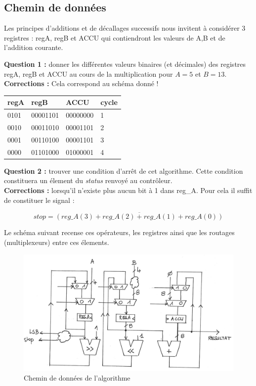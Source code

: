\documentclass[a4paper,11pt]{article}
\begin{document}
\subsection{Chemin de données}

Les principes d'additions et de décallages successifs nous invitent à considérer 3 registres : regA, regB et ACCU qui contiendront les valeurs de A,B et de l'addition courante.

\FloatBarrier

{\bf Question 1 : }  donner les différentes valeurs binaires (et décimales) des registres regA, regB et ACCU au cours de la multiplication pour $A=5$ et $B=13$.\\

{\bf Corrections :} Cela correspond au schéma donné !

\begin{table}
    \begin{tabular}{|l|l|l|l|}
        \hline
        regA & regB     & ACCU     & cycle \\ \hline
        0101 & 00001101 & 00000000 & 1     \\ \hline
        0010 & 00011010 & 00001101 & 2     \\ \hline
        0001 & 00110100 & 00001101 & 3     \\ \hline
        0000 & 01101000 & 01000001 & 4     \\
        \hline
    \end{tabular}
\end{table}
\FloatBarrier

{\bf Question 2 : }  trouver une condition d'arrêt de cet algorithme. Cette condition constituera un élement du {\it status} renvoyé au contrôleur.\\

{\bf Corrections :} lorsqu'il n'existe plus aucun bit à 1 dans reg\_A. Pour cela il suffit de constituer le signal :

$$ stop= \overline{(reg\_A(3) + reg\_A(2) + reg\_A(1) + reg\_A(0))}$$

Le schéma suivant recense ces opérateurs, les registres ainsi que les routages (multiplexeurs) entre ces élements.

\begin{figure}[!h]
\begin{center}
\includegraphics[scale=0.3]{./figures/datapath.png}
\end{center}
\caption{Chemin de données de l'algorithme}
\end{figure}
\FloatBarrier
\end{document}
